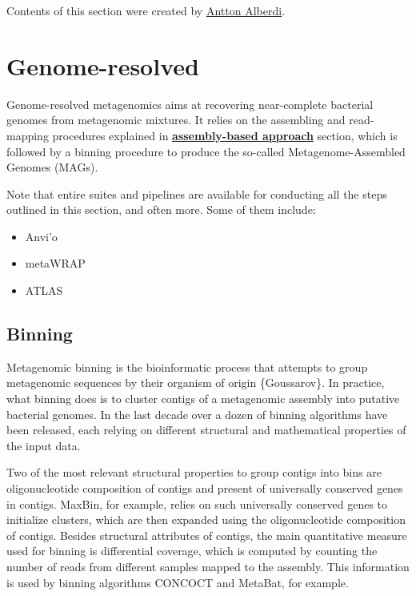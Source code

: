 \documentclass[
]{book}
\providecommand{\tightlist}{%
  \setlength{\itemsep}{0pt}\setlength{\parskip}{0pt}}
\begin{document}
Contents of this section were created by \protect\hyperlink{antton-alberdi}{Antton Alberdi}.

\hypertarget{genome-resolved}{%
\section{Genome-resolved}\label{genome-resolved}}

Genome-resolved metagenomics aims at recovering near-complete bacterial genomes from metagenomic mixtures. It relies on the assembling and read-mapping procedures explained in \textbf{\protect\hyperlink{assembly-based}{assembly-based approach}} section, which is followed by a binning procedure to produce the so-called Metagenome-Assembled Genomes (MAGs).

Note that entire suites and pipelines are available for conducting all the steps outlined in this section, and often more. Some of them include:

\begin{itemize}
\tightlist
\item
  Anvi'o
\item
  metaWRAP
\item
  ATLAS
\end{itemize}

\hypertarget{genome-resolved-binning}{%
\subsection*{Binning}\label{genome-resolved-binning}}

Metagenomic binning is the bioinformatic process that attempts to group metagenomic sequences by their organism of origin \{Goussarov\}. In practice, what binning does is to cluster contigs of a metagenomic assembly into putative bacterial genomes. In the last decade over a dozen of binning algorithms have been released, each relying on different structural and mathematical properties of the input data.

Two of the most relevant structural properties to group contigs into bins are oligonucleotide composition of contigs and present of universally conserved genes in contigs. MaxBin, for example, relies on such universally conserved genes to initialize clusters, which are then expanded using the oligonucleotide composition of contigs. Besides structural attributes of contigs, the main quantitative measure used for binning is differential coverage, which is computed by counting the number of reads from different samples mapped to the assembly. This information is used by binning algorithms CONCOCT and MetaBat, for example.
\end{document}
